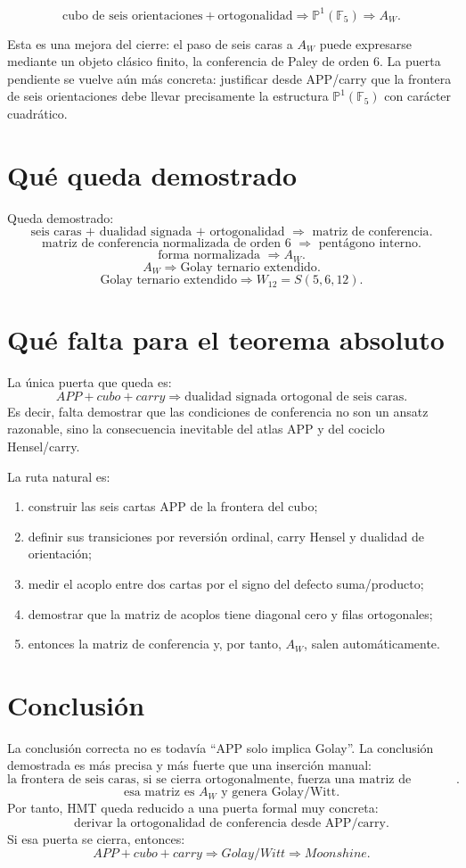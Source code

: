 \documentclass[11pt,a4paper]{article}
\newcommand{\F}{\mathbb F}
\newcommand{\PP}{\mathbb P}
\begin{document}
\[
\boxed{\text{cubo de seis orientaciones}+\text{ortogonalidad}\Longrightarrow\PP^1(\F_5)\Longrightarrow A_W.}
\]

Esta es una mejora del cierre: el paso de seis caras a \(A_W\) puede expresarse mediante un objeto clásico finito, la conferencia de Paley de orden 6. La puerta pendiente se vuelve aún más concreta: justificar desde APP/carry que la frontera de seis orientaciones debe llevar precisamente la estructura \(\PP^1(\F_5)\) con carácter cuadrático.

\section{Qué queda demostrado}
Queda demostrado:
\[
\boxed{\text{seis caras + dualidad signada + ortogonalidad }\Rightarrow\text{ matriz de conferencia}.}
\]
\[
\boxed{\text{matriz de conferencia normalizada de orden 6 }\Rightarrow\text{ pentágono interno}.}
\]
\[
\boxed{\text{forma normalizada }\Rightarrow A_W.}
\]
\[
\boxed{A_W\Rightarrow\text{Golay ternario extendido}.}
\]
\[
\boxed{\text{Golay ternario extendido}\Rightarrow W_{12}=S(5,6,12).}
\]

\section{Qué falta para el teorema absoluto}
La única puerta que queda es:
\[
\boxed{APP+cubo+carry\Rightarrow\text{dualidad signada ortogonal de seis caras}.}
\]
Es decir, falta demostrar que las condiciones de conferencia no son un ansatz razonable, sino la consecuencia inevitable del atlas APP y del cociclo Hensel/carry.

La ruta natural es:
\begin{enumerate}[leftmargin=2em]
\item construir las seis cartas APP de la frontera del cubo;
\item definir sus transiciones por reversión ordinal, carry Hensel y dualidad de orientación;
\item medir el acoplo entre dos cartas por el signo del defecto suma/producto;
\item demostrar que la matriz de acoplos tiene diagonal cero y filas ortogonales;
\item entonces la matriz de conferencia y, por tanto, \(A_W\), salen automáticamente.
\end{enumerate}

\section{Conclusión}
La conclusión correcta no es todavía ``APP solo implica Golay''. La conclusión demostrada es más precisa y más fuerte que una inserción manual:
\[
\boxed{\text{la frontera de seis caras, si se cierra ortogonalmente, fuerza una matriz de conferencia pentagonal}.}
\]
\[
\boxed{\text{esa matriz es }A_W\text{ y genera Golay/Witt}.}
\]
Por tanto, HMT queda reducido a una puerta formal muy concreta:
\[
\boxed{\text{derivar la ortogonalidad de conferencia desde APP/carry}.}
\]
Si esa puerta se cierra, entonces:
\[
\boxed{APP+cubo+carry\Longrightarrow Golay/Witt\Longrightarrow Moonshine.}
\]
\end{document}
